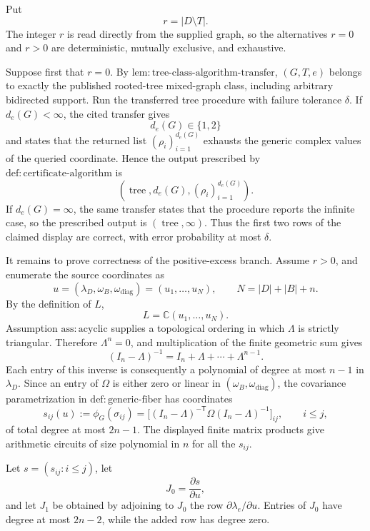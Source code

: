 Put
\[
r=|D\setminus T|.
\]
The integer \(r\) is read directly from the supplied graph, so the alternatives \(r=0\) and \(r>0\) are deterministic, mutually exclusive, and exhaustive.

Suppose first that \(r=0\).  By \(\mathrm{lem:tree\mbox{-}class\mbox{-}algorithm\mbox{-}transfer}\), \((G,T,e)\) belongs to exactly the published rooted-tree mixed-graph class, including arbitrary bidirected support.  Run the transferred tree procedure with failure tolerance \(\delta\).  If \(d_e(G)<\infty\), the cited transfer gives
\[
d_e(G)\in\{1,2\}
\]
and states that the returned list \((\rho_i)_{i=1}^{d_e(G)}\) exhausts the generic complex values of the queried coordinate.  Hence the output prescribed by \(\mathrm{def:certificate\mbox{-}algorithm}\) is
\[
(\operatorname{tree},d_e(G),(\rho_i)_{i=1}^{d_e(G)}).
\]
If \(d_e(G)=\infty\), the same transfer states that the procedure reports the infinite case, so the prescribed output is \((\operatorname{tree},\infty)\).  Thus the first two rows of the claimed display are correct, with error probability at most \(\delta\).

It remains to prove correctness of the positive-excess branch.  Assume \(r>0\), and enumerate the source coordinates as
\[
u=(\lambda_D,\omega_B,\omega_{\mathrm{diag}})=(u_1,\ldots,u_N),
\qquad N=|D|+|B|+n.
\]
By the definition of \(L\),
\[
L=\mathbb C(u_1,\ldots,u_N).
\]
Assumption \(\mathrm{ass:acyclic}\) supplies a topological ordering in which \(\Lambda\) is strictly triangular.  Therefore \(\Lambda^n=0\), and multiplication of the finite geometric sum gives
\[
(I_n-\Lambda)^{-1}=I_n+\Lambda+\cdots+\Lambda^{n-1}.
\]
Each entry of this inverse is consequently a polynomial of degree at most \(n-1\) in \(\lambda_D\).  Since an entry of \(\Omega\) is either zero or linear in \((\omega_B,\omega_{\mathrm{diag}})\), the covariance parametrization in \(\mathrm{def:generic\mbox{-}fiber}\) has coordinates
\[
s_{ij}(u):=\phi_G(\sigma_{ij})
=\bigl[(I_n-\Lambda)^{-\mathsf T}\Omega(I_n-\Lambda)^{-1}\bigr]_{ij},
\qquad i\leq j,
\]
of total degree at most \(2n-1\).  The displayed finite matrix products give arithmetic circuits of size polynomial in \(n\) for all the \(s_{ij}\).

Let \(s=(s_{ij}:i\leq j)\), let
\[
J_0=\frac{\partial s}{\partial u},
\]
and let \(J_1\) be obtained by adjoining to \(J_0\) the row \(\partial\lambda_e/\partial u\).  Entries of \(J_0\) have degree at most \(2n-2\), while the added row has degree zero.


